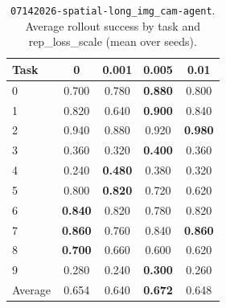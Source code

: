 
\begin{table}
\caption{\texttt{07142026-spatial-long\_img\_cam-agent}. Average rollout success by task and rep\_loss\_scale (mean over seeds).}
\label{tab:07142026_spatial_long_img_cam_agent_rep_loss_success}
\begin{tabular}{lcccc}
\toprule
Task & 0 & 0.001 & 0.005 & 0.01 \\
\midrule
0 & 0.700 & 0.780 & \textbf{0.880} & 0.800 \\
1 & 0.820 & 0.640 & \textbf{0.900} & 0.840 \\
2 & 0.940 & 0.880 & 0.920 & \textbf{0.980} \\
3 & 0.360 & 0.320 & \textbf{0.400} & 0.360 \\
4 & 0.240 & \textbf{0.480} & 0.380 & 0.320 \\
5 & 0.800 & \textbf{0.820} & 0.720 & 0.620 \\
6 & \textbf{0.840} & 0.820 & 0.780 & 0.820 \\
7 & \textbf{0.860} & 0.760 & 0.840 & \textbf{0.860} \\
8 & \textbf{0.700} & 0.660 & 0.600 & 0.620 \\
9 & 0.280 & 0.240 & \textbf{0.300} & 0.260 \\
\midrule
Average & 0.654 & 0.640 & \textbf{0.672} & 0.648 \\
\bottomrule
\end{tabular}
\end{table}
